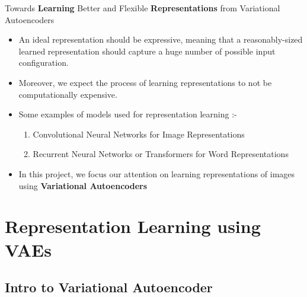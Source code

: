 \documentclass[hyperref={colorlinks,citecolor=blue,linkcolor=blue,urlcolor=blue}]{beamer}
\begin{document}
\begin{frame}{ Towards \textbf{Learning} Better and Flexible \textbf{Representations} from Variational Autoencoders \vspace{0.3em}}
\begin{itemize}
  \item An ideal representation should be expressive, meaning that a reasonably-sized learned representation should capture a huge number of possible input configuration.
  \item Moreover, we expect the process of learning representations to not be computationally expensive.
  \item Some examples of models used for representation learning :-
  \begin{enumerate}
    \item Convolutional Neural Networks for Image Representations
    \item Recurrent Neural Networks or Transformers for Word Representations
  \end{enumerate}
  \item In this project, we focus our attention on learning representations of images using \textbf{Variational Autoencoders}
\end{itemize}
\end{frame}

\section{Representation Learning using VAEs}
\subsection{Intro to Variational Autoencoder}
\end{document}
